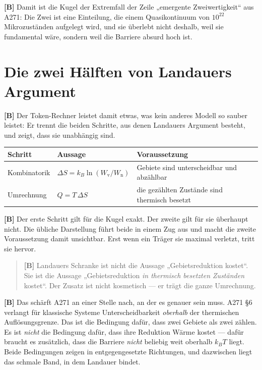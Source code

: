 \textbf{[B]} Damit ist die Kugel der Extremfall der Zeile „emergente Zweiwertigkeit“ aus
A271: Die Zwei ist eine Einteilung, die einem Quasikontinuum von $10^{22}$
Mikrozuständen aufgelegt wird, und sie überlebt nicht deshalb, weil sie
fundamental wäre, sondern weil die Barriere absurd hoch ist.

\section{Die zwei Hälften von Landauers Argument}
\label{sec:zweihaelften}

\textbf{[B]} Der Token-Rechner leistet damit etwas, was kein anderes Modell so sauber
leistet: Er trennt die beiden Schritte, aus denen Landauers Argument besteht, und
zeigt, dass sie unabhängig sind.

\begin{center}
\small
\begin{tabular}{@{}p{}p{}p{}@{}}
\toprule
\textbf{Schritt} & \textbf{Aussage} & \textbf{Voraussetzung} \\
\midrule
Kombinatorik & $\Delta S = k_B \ln(W_{\text{v}}/W_{\text{n}})$ &
Gebiete sind unterscheidbar und abzählbar \\
Umrechnung & $Q = T\,\Delta S$ &
die gezählten Zustände sind thermisch besetzt \\
\bottomrule
\end{tabular}
\end{center}

\textbf{[B]} Der erste Schritt gilt für die Kugel exakt. Der zweite gilt für sie
überhaupt nicht. Die übliche Darstellung führt beide in einem Zug aus und macht
die zweite Voraussetzung damit unsichtbar. Erst wenn ein Träger sie maximal
verletzt, tritt sie hervor.

\begin{quote}
\textbf{[B]} Landauers Schranke ist nicht die Aussage „Gebietsreduktion kostet“. Sie ist
die Aussage „Gebietsreduktion \emph{in thermisch besetzten Zuständen} kostet“.
Der Zusatz ist nicht kosmetisch --- er trägt die ganze Umrechnung.
\end{quote}

\textbf{[B]} Das schärft A271 an einer Stelle nach, an der es genauer sein muss. A271
§6 verlangt für klassische Systeme Unterscheidbarkeit \emph{oberhalb} der
thermischen Auflösungsgrenze. Das ist die Bedingung dafür, dass zwei Gebiete als
zwei zählen. Es ist \emph{nicht} die Bedingung dafür, dass ihre Reduktion Wärme
kostet --- dafür braucht es zusätzlich, dass die Barriere \emph{nicht} beliebig
weit oberhalb $k_BT$ liegt. Beide Bedingungen zeigen in entgegengesetzte
Richtungen, und dazwischen liegt das schmale Band, in dem Landauer bindet.

